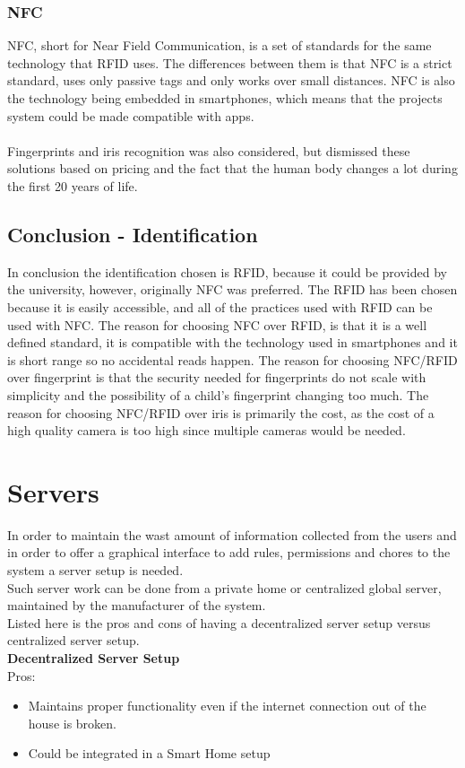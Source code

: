 \subsubsection{NFC}
NFC, short for Near Field Communication, is a set of standards for the same technology that RFID uses. The differences between them is that NFC is a strict standard, uses only passive tags and only works over small distances.\citep{rfidAndNfc} NFC is also the technology being embedded in smartphones, which means that the projects system could be made compatible with apps.\\
\\
Fingerprints and iris recognition was also considered, but dismissed these solutions based on pricing and the fact that the human body changes a lot during the first 20 years of life.\citep{irisid}

\subsection{Conclusion - Identification}
In conclusion the identification chosen is RFID, because it could be provided by the university, however, originally NFC was preferred. 
The RFID has been chosen because it is easily accessible, and all of the practices used with RFID can be used with NFC. The reason for choosing NFC over RFID, is that it is a well defined standard, it is compatible with the technology used in smartphones and it is short range so no accidental reads happen. The reason for choosing NFC/RFID over fingerprint is that the security needed for fingerprints do not scale with simplicity and the possibility of a child's fingerprint changing too much. The reason for choosing NFC/RFID over iris is primarily the cost, as the cost of a high quality camera is too high since multiple cameras would be needed.

\section{Servers}
In order to maintain the wast amount of information collected from the users and in order to offer a graphical interface to add rules, permissions and chores to the system a server setup is needed.\\
Such server work can be done from a private home or centralized global server, maintained by the manufacturer of the system.\\

Listed here is the pros and cons of having a decentralized server setup versus centralized server setup.\\
\newpage
\textbf{Decentralized Server Setup}\\
Pros:
\begin{itemize}
	\item Maintains proper functionality even if the internet connection out of the house is broken.
	\item Could be integrated in a Smart Home setup
\end{itemize}

